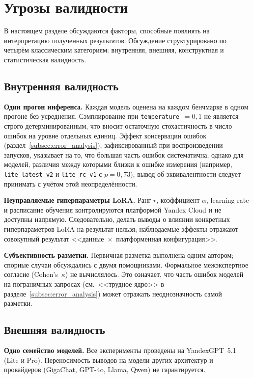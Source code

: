 
\section{Угрозы валидности} \label{sec:threats}

В настоящем разделе обсуждаются факторы, способные повлиять на интерпретацию полученных результатов. Обсуждение структурировано по четырём классическим категориям: внутренняя, внешняя, конструктная и статистическая валидность.

\subsection{Внутренняя валидность}

\textbf{Один прогон инференса.} Каждая модель оценена на каждом бенчмарке в одном прогоне без усреднения. Сэмплирование при \texttt{temperature}~$= 0{,}1$ не является строго детерминированным, что вносит остаточную стохастичность в число ошибок на уровне отдельных единиц. Эффект консервации ошибок (раздел~\ref{subsec:error_analysis}), зафиксированный при воспроизведении запусков, указывает на то, что большая часть ошибок систематична; однако для моделей, различия между которыми близки к ошибке измерения (например, \texttt{lite\_latest\_v2} и \texttt{lite\_rc\_v1} с $p = 0{,}73$), вывод об эквивалентности следует принимать с учётом этой неопределённости.

\textbf{Неуправляемые гиперпараметры LoRA.} Ранг $r$, коэффициент $\alpha$, learning rate и расписание обучения контролируются платформой Yandex Cloud и не доступны напрямую. Следовательно, делать выводы о влиянии конкретных гиперпараметров LoRA на результат нельзя; наблюдаемые эффекты отражают совокупный результат <<данные~$\times$~платформенная конфигурация>>.

\textbf{Субъективность разметки.} Первичная разметка выполнена одним автором; спорные случаи обсуждались с двумя помощниками. Формальное межэкспертное согласие (Cohen's~$\kappa$) не вычислялось. Это означает, что часть ошибок моделей на пограничных запросах (см.~<<трудное ядро>> в разделе~\ref{subsec:error_analysis}) может отражать неоднозначность самой разметки.

\subsection{Внешняя валидность}

\textbf{Одно семейство моделей.} Все эксперименты проведены на YandexGPT~5.1 (Lite и Pro). Переносимость выводов на модели других архитектур и провайдеров (GigaChat, GPT-4o, Llama, Qwen) не гарантируется.


